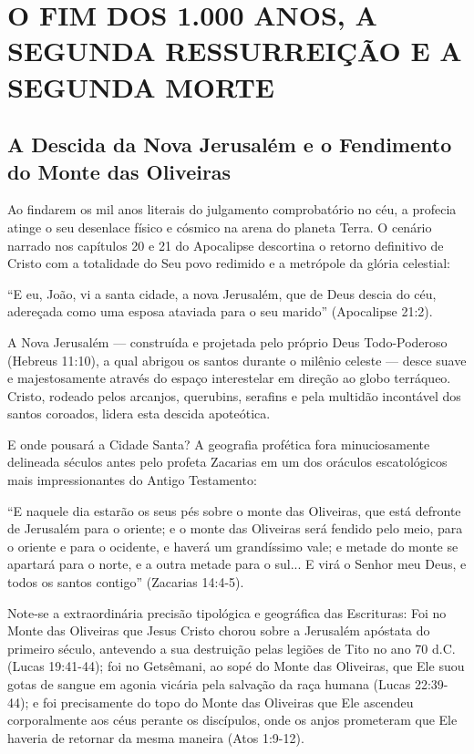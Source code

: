\section{O FIM DOS 1.000 ANOS, A SEGUNDA RESSURREIÇÃO E A SEGUNDA MORTE}



\subsection{A Descida da Nova Jerusalém e o Fendimento do Monte das Oliveiras}


Ao findarem os mil anos literais do julgamento comprobatório no céu, a profecia atinge o seu desenlace físico e cósmico na arena do planeta Terra. O cenário narrado nos capítulos 20 e 21 do Apocalipse descortina o retorno definitivo de Cristo com a totalidade do Seu povo redimido e a metrópole da glória celestial:

``E eu, João, vi a santa cidade, a nova Jerusalém, que de Deus descia do céu, adereçada como uma esposa ataviada para o seu marido'' (Apocalipse 21:2).

A Nova Jerusalém — construída e projetada pelo próprio Deus Todo-Poderoso (Hebreus 11:10), a qual abrigou os santos durante o milênio celeste — desce suave e majestosamente através do espaço interestelar em direção ao globo terráqueo. Cristo, rodeado pelos arcanjos, querubins, serafins e pela multidão incontável dos santos coroados, lidera esta descida apoteótica.

E onde pousará a Cidade Santa?
A geografia profética fora minuciosamente delineada séculos antes pelo profeta Zacarias em um dos oráculos escatológicos mais impressionantes do Antigo Testamento:

``E naquele dia estarão os seus pés sobre o monte das Oliveiras, que está defronte de Jerusalém para o oriente; e o monte das Oliveiras será fendido pelo meio, para o oriente e para o ocidente, e haverá um grandíssimo vale; e metade do monte se apartará para o norte, e a outra metade para o sul... E virá o Senhor meu Deus, e todos os santos contigo'' (Zacarias 14:4-5).

Note-se a extraordinária precisão tipológica e geográfica das Escrituras:
Foi no Monte das Oliveiras que Jesus Cristo chorou sobre a Jerusalém apóstata do primeiro século, antevendo a sua destruição pelas legiões de Tito no ano 70 d.C. (Lucas 19:41-44); foi no Getsêmani, ao sopé do Monte das Oliveiras, que Ele suou gotas de sangue em agonia vicária pela salvação da raça humana (Lucas 22:39-44); e foi precisamente do topo do Monte das Oliveiras que Ele ascendeu corporalmente aos céus perante os discípulos, onde os anjos prometeram que Ele haveria de retornar da mesma maneira (Atos 1:9-12).


